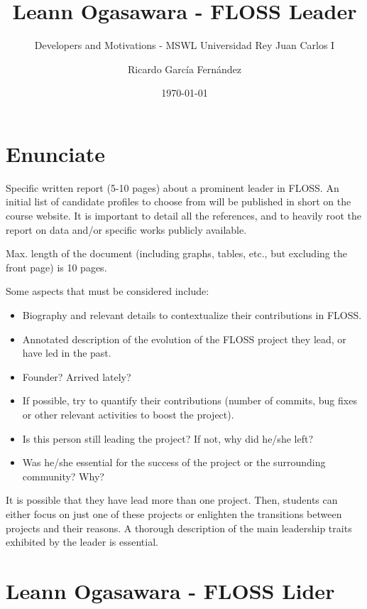 \documentclass[11pt]{scrartcl}
\title{\textbf{Leann Ogasawara - FLOSS Leader}}
\subtitle{Developers and Motivations - MSWL Universidad Rey Juan Carlos I}
\author{Ricardo García Fernández}
\date{\today}
\begin{document}
\maketitle

\newpage

\tableofcontents

\newpage

\section{Enunciate}

Specific written report (5-10 pages) about a prominent leader in FLOSS. An initial list of candidate profiles to choose from will be published in short on the course website. It is important to detail all the references, and to heavily root the report on data and/or specific works publicly available.

Max. length of the document (including graphs, tables, etc., but excluding the front page) is 10 pages.

Some aspects that must be considered include:
\begin{itemize}
    \item Biography and relevant details to contextualize their contributions in FLOSS.
    \item Annotated description of the evolution of the FLOSS project they lead, or have led in the past.
    \item Founder? Arrived lately?
    \item If possible, try to quantify their contributions (number of commits, bug fixes or other relevant activities to boost the project).
    \item Is this person still leading the project? If not, why did he/she left?
    \item Was he/she essential for the success of the project or the surrounding community? Why?
\end{itemize}

It is possible that they have lead more than one project. Then, students can either focus on just one of these projects or enlighten the transitions between projects and their reasons. A thorough description of the main leadership traits exhibited by the leader is essential.

\section{Leann Ogasawara - FLOSS Lider}
\end{document}
